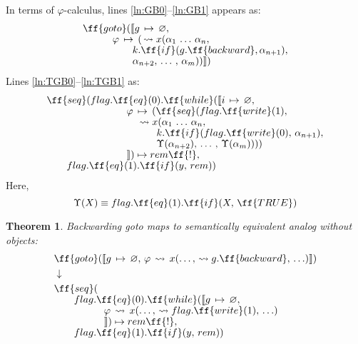 \documentclass[sigplan,review,11pt,nonacm,natbib=false]{acmart}
\theoremstyle{theorems}
\newtheorem{eotheorem}{Theorem}
\newcommand\br{\\[-4pt]}
\begin{document}
In terms of $\varphi$-calculus, lines \ref{ln:GB0}--\ref{ln:GB1} appears as:
\begin{equation}
\begin{split}
& \ff{goto}(\llbracket g\,\mapsto\,\varnothing,\br
& \quad \quad \quad \varphi\,\mapsto\,(\,\leadsto x(\alpha_1\,\ldots\,\alpha_n, \br
& \quad \quad \quad \quad \quad k.\ff{if}(g.\ff{backward}, \alpha_{n+1}), \br
& \quad \quad \quad \quad \quad \alpha_{n+2},\,\ldots\,,\,\alpha_m))\rrbracket) \\
\end{split}
\end{equation}
Lines \ref{ln:TGB0}--\ref{ln:TGB1} as:
\begin{equation}
\begin{split}
& \ff{seq}(flag.\ff{eq}(0).\ff{while}(\llbracket i\,\mapsto\,\varnothing,\br
& \quad \quad \quad \quad \quad \quad \quad \quad \varphi\,\mapsto\,(\ff{seq}(flag.\ff{write}(1), \br
& \quad \quad \quad \quad \quad \quad \quad \quad \quad \leadsto x(\alpha_1\,\ldots\,\alpha_n, \br
& \quad \quad \quad \quad \quad \quad \quad \quad \quad \quad \quad k.\ff{if}(flag.\ff{write}(0),\,\alpha_{n+1}), \br
& \quad \quad \quad \quad \quad \quad \quad \quad \quad \quad \quad \Upsilon(\alpha_{n+2}),\,\ldots\,,\,\Upsilon(\alpha_m)))) \br
& \quad \quad \quad \quad \quad \quad \quad \quad \rrbracket)\mapsto rem\ff{!}, \br
& \quad \quad flag.\ff{eq}(1).\ff{if}(y,\,rem)) \\
\end{split}
\end{equation}
Here,
\begin{equation}
\Upsilon(X) \equiv flag.\ff{eq}(1).\ff{if}(X,\,\ff{TRUE})
\end{equation}

\begin{eotheorem}
\emph{Backwarding goto} maps to semantically equivalent analog without  objects:
\begin{equation*}
\begin{split}
& \ff{goto}(\llbracket g\,\mapsto\,\varnothing,\,\varphi\,\leadsto\,x(\ldots,\,\leadsto g.\ff{backward},\,\ldots)\rrbracket) \\
& \downarrow \\
& \ff{seq}( \br
& \quad \quad flag.\ff{eq}(0).\ff{while}(\llbracket g\,\mapsto\,\varnothing,\br
& \quad \quad \quad \quad \quad \varphi\,\leadsto\,x(\ldots,\,\leadsto flag.\ff{write}(1),\,\ldots)\br
& \quad \quad \quad \quad \quad \rrbracket)\mapsto rem\ff{!}, \br
& \quad \quad flag.\ff{eq}(1).\ff{if}(y,\,rem)) \\
\end{split}
\end{equation*}
\end{eotheorem}
\end{document}
